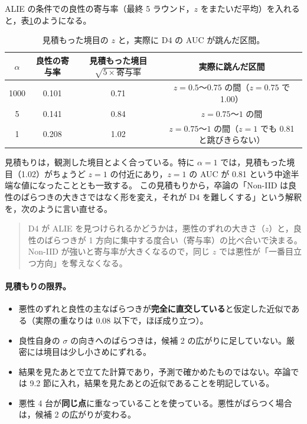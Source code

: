 \documentclass[a4j, dvipdfmx]{jsarticle}  %
\begin{document}
ALIE の条件での良性の寄与率（最終 5 ラウンド，$z$ をまたいだ平均）を入れると，表\ref{tab:d4-threshold}のようになる。

\begin{table}[H]
\centering
\caption{見積もった境目の $z$ と，実際に D4 の AUC が跳んだ区間。}
\label{tab:d4-threshold}
\begin{tabular}{@{}cccc@{}}
\toprule
$\alpha$ & 良性の寄与率 & 見積もった境目 $\sqrt{5 \times \text{寄与率}}$ & 実際に跳んだ区間 \\
\midrule
1000 & 0.101 & 0.71 & $z = 0.5$〜$0.75$ の間（$z = 0.75$ で 1.00） \\
5 & 0.141 & 0.84 & $z = 0.75$〜$1$ の間 \\
1 & 0.208 & 1.02 & $z = 0.75$〜$1$ の間（$z = 1$ でも 0.81 と跳びきらない） \\
\bottomrule
\end{tabular}
\end{table}

見積もりは，観測した境目とよく合っている。特に $\alpha = 1$ では，見積もった境目（1.02）がちょうど $z = 1$ の付近にあり，$z = 1$ の AUC が 0.81 という中途半端な値になったこととも一致する。
この見積もりから，卒論の「Non-IID は良性のばらつきの大きさではなく形を変え，それが D4 を難しくする」という解釈を，次のように言い直せる。
\begin{quote}
D4 が ALIE を見つけられるかどうかは，悪性のずれの大きさ（$z$）と，良性のばらつきが 1 方向に集中する度合い（寄与率）の比べ合いで決まる。
Non-IID が強いと寄与率が大きくなるので，同じ $z$ では悪性が「一番目立つ方向」を奪えなくなる。
\end{quote}

\paragraph{見積もりの限界。}
\begin{itemize}
  \item 悪性のずれと良性の主なばらつきが\textbf{完全に直交している}と仮定した近似である（実際の重なりは 0.08 以下で，ほぼ成り立つ）。
  \item 良性自身の $\sigma$ の向きへのばらつきは，候補 2 の広がりに足していない。厳密には境目は少し小さめにずれる。
  \item 結果を見たあとで立てた計算であり，予測で確かめたものではない。卒論では 9.2 節に入れ，結果を見たあとの近似であることを明記している。
  \item 悪性 4 台が\textbf{同じ点}に重なっていることを使っている。悪性がばらつく場合は，候補 2 の広がりが変わる。
\end{itemize}
\end{document}
